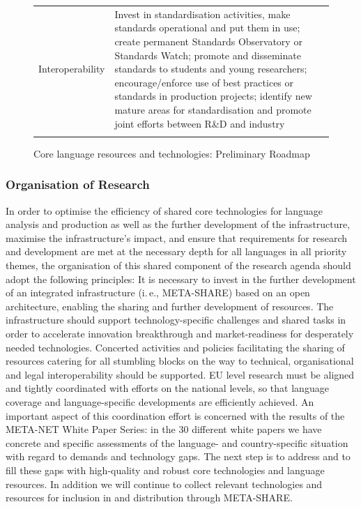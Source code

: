 \documentclass[10pt, plain]{../../metanetpaper}
\begin{document}
\begin{multicols}{2}
\begin{figure}[htbp]
\begin{tabular}{@{}p{2.5cm}p{8cm}p{4cm}@{}}
    Interoperability & Invest in standardisation activities, make standards operational and put them in use; create permanent Standards Observatory or Standards Watch; promote and disseminate standards to students and young researchers; encourage/enforce use of best practices or standards in production projects; identify new mature areas for standardisation and promote joint efforts between R\&D and industry & \\ \addlinespace\bottomrule
  \end{tabular}
  \caption{Core language resources and technologies: Preliminary Roadmap}
  \label{fig:lrlt-roadmap}
\end{figure}

\subsubsection{Organisation of Research}
\label{sec:org-research-pt4}

In order to optimise the efficiency of shared core technologies for language analysis and production as well as the further development of the infrastructure, maximise the infrastructure's impact, and ensure that requirements for research and development are met at the necessary depth for all languages in all priority themes, the organisation of this shared component of the research agenda should adopt the following principles: It is necessary to invest in the further development of an integrated infrastructure (i.\,e., META-SHARE) based on an open architecture, enabling the sharing and further development of resources. The infrastructure should support technology-specific challenges and shared tasks in order to accelerate innovation breakthrough and market-readiness for desperately needed technologies. Concerted activities and policies facilitating the sharing of resources catering for all stumbling blocks on the way to technical, organisational and legal interoperability should be supported. EU level research must be aligned and tightly coordinated with efforts on the national levels, so that language coverage and language-specific developments are efficiently achieved. An important aspect of this coordination effort is concerned with the results of the META-NET White Paper Series: in the 30 different white papers we have concrete and specific assessments of the language- and country-specific situation with regard to demands and technology gaps. The next step is to address and to fill these gaps with high-quality and robust core technologies and language resources. In addition we will continue to collect relevant technologies and resources for inclusion in and distribution through META-SHARE.


\end{multicols}
\end{document}
